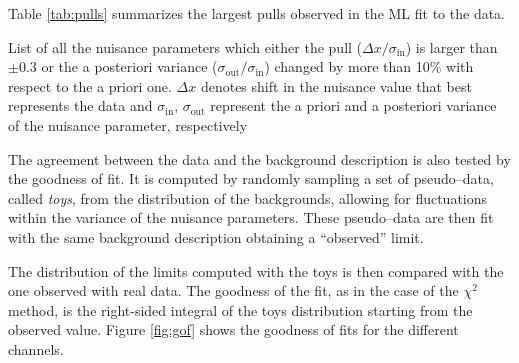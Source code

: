Table \ref{tab:pulls} summarizes the largest pulls observed in the ML fit to the data.

\begin{table}

\caption{List of all the nuisance parameters which either the pull ($\Delta x/\sigma_{\text{in}}$) is larger than $\pm0.3$ or the a posteriori variance ($\sigma_{\text{out}}/\sigma_{\text{in}}$) changed by more than 10\% with respect to the a priori one. $\Delta x$ denotes shift in the nuisance value that best represents the data and $\sigma_{\text{in}}, \,\sigma_{\text{out}}$ represent the a priori and a posteriori variance of the nuisance parameter, respectively}
\label{tab:pulls}
\end{table}

The agreement between the data and the background description is also tested by the goodness of fit. It is computed by randomly sampling a set of pseudo--data, called \emph{toys}, from the distribution of the backgrounds, allowing for fluctuations within the variance of the nuisance parameters. These pseudo--data are then fit with the same background description obtaining a ``observed'' limit. 

The distribution of the limits computed with the toys is then compared with the one observed with real data. The goodness of the fit, as in the case of the $\chi^2$ method, is the right-sided integral of the toys distribution starting from the observed value. Figure \ref{fig:gof} shows the goodness of fits for the different channels.

